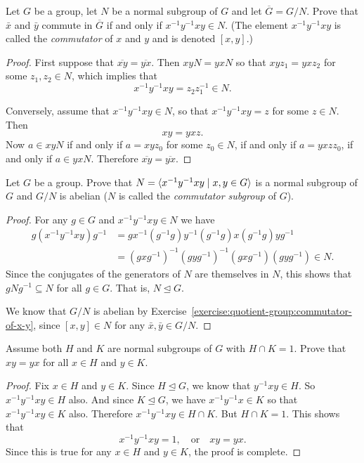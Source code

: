 \label{exercise:quotient-group:commutator-of-x-y}
Let $G$ be a group, let $N$ be a normal subgroup of $G$ and let
$\overline{G} = G/N$. Prove that $\bar{x}$ and $\bar{y}$ commute in
$\overline{G}$ if and only if $x^{-1}y^{-1}xy\in N$. (The element
$x^{-1}y^{-1}xy$ is called the {\em commutator} of $x$ and $y$ and is
denoted $[x,y]$.)
\begin{proof}
  First suppose that $\overline{xy} = \overline{yx}$. Then $xyN = yxN$
  so that $xyz_1 = yxz_2$ for some $z_1,z_2\in N$, which implies that
  \begin{equation*}
    x^{-1}y^{-1}xy = z_2z_1^{-1} \in N.
  \end{equation*}

  Conversely, assume that $x^{-1}y^{-1}xy \in N$, so that
  $x^{-1}y^{-1}xy = z$ for some $z\in N$. Then
  \begin{equation*}
    xy = yxz.
  \end{equation*}
  Now $a\in xyN$ if and only if $a = xyz_0$ for some $z_0\in N$, if
  and only if $a = yxzz_0$, if and only if $a\in yxN$. Therefore
  $\overline{xy} = \overline{yx}$.
\end{proof}

\label{exercise:quotient-group:commutator-subgroup-is-normal}
Let $G$ be a group. Prove that $N = \langle{x^{-1}y^{-1}xy\mid x,y\in G}\rangle$
is a normal subgroup of $G$ and $G/N$ is abelian ($N$ is called the
{\em commutator subgroup} of $G$).
\begin{proof}
  For any $g\in G$ and $x^{-1}y^{-1}xy\in N$ we have
  \begin{align*}
    g(x^{-1}y^{-1}xy)g^{-1}
    &= gx^{-1}(g^{-1}g)y^{-1}(g^{-1}g)x(g^{-1}g)yg^{-1} \\
    &= (gxg^{-1})^{-1}(gyg^{-1})^{-1}(gxg^{-1})(gyg^{-1}) \in N.
  \end{align*}
  Since the conjugates of the generators of $N$ are themselves in $N$,
  this shows that $gNg^{-1}\subseteq N$ for all $g\in G$. That is,
  $N\trianglelefteq G$.

  We know that $G/N$ is abelian by
  Exercise~\ref{exercise:quotient-group:commutator-of-x-y}, since
  $[x,y]\in N$ for any $\bar{x},\bar{y}\in G/N$.
\end{proof}

 Assume both $H$ and $K$ are normal subgroups of $G$ with
$H\cap K = 1$. Prove that $xy = yx$ for all $x\in H$ and $y\in K$.
\begin{proof}
  Fix $x\in H$ and $y\in K$. Since $H\trianglelefteq G$, we know that
  $y^{-1}xy\in H$. So $x^{-1}y^{-1}xy\in H$ also. And since
  $K\trianglelefteq G$, we have $x^{-1}y^{-1}x\in K$ so that
  $x^{-1}y^{-1}xy\in K$ also. Therefore $x^{-1}y^{-1}xy\in H\cap
  K$. But $H\cap K = 1$. This shows that
  \begin{equation*}
    x^{-1}y^{-1}xy = 1,
    \quad\text{or}\quad
    xy = yx.
  \end{equation*}
  Since this is true for any $x\in H$ and $y\in K$, the proof is
  complete.
\end{proof}

